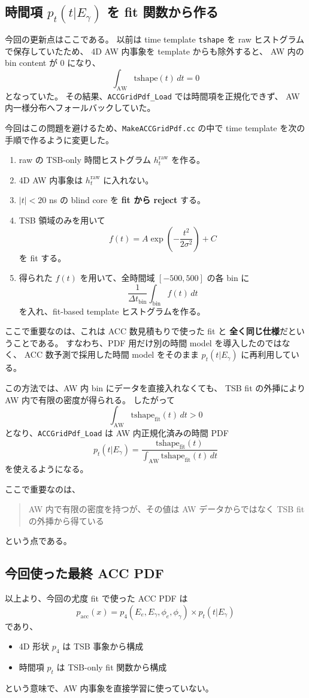 \documentclass[a4paper,11pt]{jsarticle}
\begin{document}
\subsection{時間項 \(p_t(t|E_\gamma)\) を fit 関数から作る}
今回の更新点はここである。
以前は time template \texttt{tshape} を raw ヒストグラムで保存していたため、
4D AW 内事象を template からも除外すると、
AW 内の bin content が 0 になり、
\[
\int_{\mathrm{AW}} \mathrm{tshape}(t)\,dt = 0
\]
となっていた。
その結果、\texttt{ACCGridPdf\_Load} では時間項を正規化できず、
AW 内一様分布へフォールバックしていた。

今回はこの問題を避けるため、\texttt{MakeACCGridPdf.cc} の中で
time template を次の手順で作るように変更した。
\begin{enumerate}
  \item raw の TSB-only 時間ヒストグラム \(h_t^{\mathrm{raw}}\) を作る。
  \item 4D AW 内事象は \(h_t^{\mathrm{raw}}\) に入れない。
  \item \(|t|<20\) ns の blind core を \textbf{fit から reject} する。
  \item TSB 領域のみを用いて
  \[
  f(t)=A\exp\left(-\frac{t^2}{2\sigma^2}\right)+C
  \]
  を fit する。
  \item 得られた \(f(t)\) を用いて、全時間域 \([-500,500]\) の各 bin に
  \[
  \frac{1}{\Delta t_{\mathrm{bin}}}
  \int_{\mathrm{bin}} f(t)\,dt
  \]
  を入れ、fit-based template ヒストグラムを作る。
\end{enumerate}

ここで重要なのは、これは ACC 数見積もりで使った fit と
\textbf{全く同じ仕様}だということである。
すなわち、PDF 用だけ別の時間 model を導入したのではなく、
ACC 数予測で採用した時間 model をそのまま
\(p_t(t|E_\gamma)\) に再利用している。

この方法では、AW 内 bin にデータを直接入れなくても、
TSB fit の外挿により AW 内で有限の密度が得られる。
したがって
\[
\int_{\mathrm{AW}} \mathrm{tshape}_{\mathrm{fit}}(t)\,dt > 0
\]
となり、\texttt{ACCGridPdf\_Load} は
AW 内正規化済みの時間 PDF
\[
p_t(t|E_\gamma)=
\frac{\mathrm{tshape}_{\mathrm{fit}}(t)}
{\int_{\mathrm{AW}}\mathrm{tshape}_{\mathrm{fit}}(t)\,dt}
\]
を使えるようになる。

ここで重要なのは、
\begin{quote}
AW 内で有限の密度を持つが、その値は AW データからではなく
TSB fit の外挿から得ている
\end{quote}
という点である。

\subsection{今回使った最終 ACC PDF}
以上より、今回の尤度 fit で使った ACC PDF は
\begin{equation}
p_{\mathrm{acc}}(x)
=
p_4(E_e,E_\gamma,\phi_e,\phi_\gamma)\times p_t(t|E_\gamma)
\end{equation}
であり、
\begin{itemize}
  \item 4D 形状 \(p_4\) は TSB 事象から構成
  \item 時間項 \(p_t\) は TSB-only fit 関数から構成
\end{itemize}
という意味で、AW 内事象を直接学習に使っていない。
\end{document}
